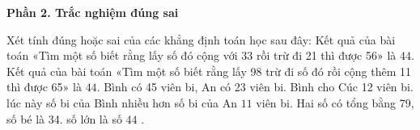 \textbf{Phần 2. Trắc nghiệm đúng sai}

\begin{ex} %
Xét tính đúng hoặc sai của các khẳng định toán học sau đây:
\choiceTF
{\True Kết quả của bài toán «Tìm một số biết rằng lấy số đó cộng với 33 rồi trừ đi 21 thì được 56» là $44$.}
{\True Kết quả của bài toán «Tìm một số biết rằng lấy 98 trừ đi số đó rồi cộng thêm 11 thì được 65» là $44$.}
{Bình có 45 viên bi, An có 23 viên bi. Bình cho Cúc 12 viên bi. lúc này số bi của Bình nhiều hơn số bi của An $11$ viên bi.}
{Hai số có tổng bằng 79, số bé là 34. số lớn là số $44$ .}
\end{ex}

